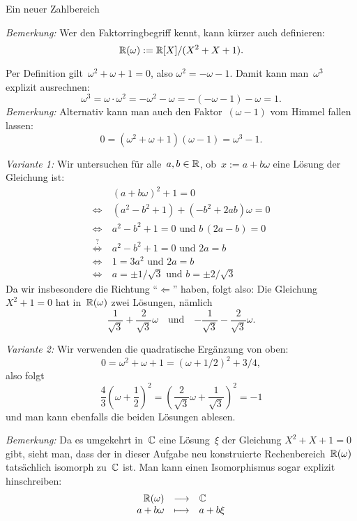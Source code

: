 \documentclass{algblatt}
\begin{document}
\begin{aufgabe}{Ein neuer Zahlbereich}
\begin{loesungE}
\emph{Bemerkung:} Wer den Faktorringbegriff kennt, kann kürzer auch definieren:
\[ \mathbb{R}(\omega) := \mathbb{R}[X]/(X^2 + X + 1). \]

\item Per Definition gilt~$\omega^2 + \omega + 1 = 0$, also $\omega^2 = -\omega
- 1$. Damit kann man~$\omega^3$ explizit ausrechnen:
\[ \omega^3 = \omega \cdot \omega^2 = -\omega^2 - \omega = -(-\omega - 1) -
\omega = 1. \]
\emph{Bemerkung:} Alternativ kann man auch den Faktor~$(\omega-1)$ vom Himmel
fallen lassen:
\[ 0 = (\omega^2 + \omega + 1) (\omega - 1) = \omega^3 - 1. \]

\item \emph{Variante 1:} Wir untersuchen für alle~$a,b \in \mathbb{R}$, ob~$x := a + b
\omega$ eine Lösung der Gleichung ist:
\begin{align*}
  & (a + b\omega)^2 + 1 = 0 \\
  \Longleftrightarrow\ &
  (a^2 - b^2 + 1) + (-b^2 + 2ab) \omega = 0 \\
  \Longleftrightarrow\ &
  a^2 - b^2 + 1 = 0 \text{ und } b \, (2a-b) = 0 \\
  \stackrel{?}{\Longleftrightarrow}\ &
  a^2 - b^2 + 1 = 0 \text{ und } 2a = b \\
  \Longleftrightarrow\ &
  1 = 3 a^2 \text{ und } 2a = b \\
  \Longleftrightarrow\ &
  a = \pm 1 / \sqrt{3} \text{ und } b = \pm 2 / \sqrt{3}
\end{align*}
Da wir insbesondere die Richtung "`$\Leftarrow$"' haben, folgt also: Die
Gleichung~$X^2 + 1 = 0$ hat in~$\mathbb{R}(\omega)$ zwei Lösungen, nämlich
\[ \frac{1}{\sqrt{3}} + \frac{2}{\sqrt{3}} \omega \quad\text{und}\quad
  {-\frac{1}{\sqrt{3}} - \frac{2}{\sqrt{3}} \omega}. \]

\emph{Variante 2:} Wir verwenden die quadratische Ergänzung von oben:
\[ 0 = \omega^2 + \omega + 1 = (\omega + 1/2)^2 + 3/4, \]
also folgt
\[ \frac{4}{3} \left(\omega + \frac{1}{2}\right)^2 = \left(
  \frac{2}{\sqrt{3}} \omega + \frac{1}{\sqrt{3}}
\right)^2 = -1 \]
und man kann ebenfalls die beiden Lösungen ablesen.

\emph{Bemerkung:} Da es umgekehrt in~$\mathbb{C}$ eine Lösung~$\xi$ der Gleichung
$X^2+X+1=0$ gibt, sieht man, dass der in dieser Aufgabe neu konstruierte
Rechenbereich~$\mathbb{R}(\omega)$ tatsächlich isomorph zu~$\mathbb{C}$ ist. Man kann einen
Isomorphismus sogar explizit hinschreiben:
\[ \begin{array}{@{}rcl@{}}
  \RR(\omega) &\longrightarrow& \CC \\
  a+b\omega &\longmapsto& a+b\xi
\end{array} \]
\end{loesungE}
\end{aufgabe}
\end{document}
